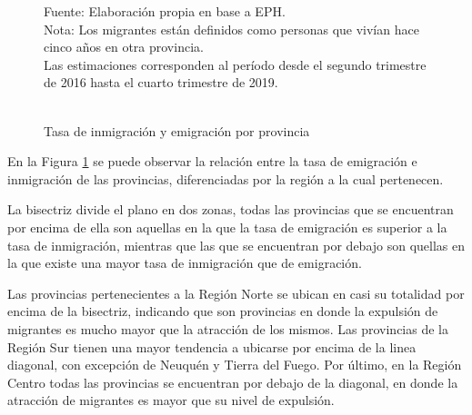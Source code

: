 \documentclass[12pt,a4paper]{article}
\begin{document}
\begin{figure}[h!]
\begin{center}
\caption{\\Tasa de inmigración y emigración por provincia}

\label{figure:emig_inmig_prov}
\end{center}
\begin{flushleft}
\begin{scriptsize}
Fuente: Elaboración propia en base a EPH.\\
Nota: Los migrantes están definidos como personas que vivían hace cinco años en otra provincia.\\
Las estimaciones corresponden al período desde el segundo trimestre de 2016 hasta el cuarto trimestre de 2019.\\
\end{scriptsize}
\end{flushleft}
\end{figure}

En la Figura \ref{figure:emig_inmig_prov} se puede observar la relación entre la tasa de emigración e inmigración de las provincias, diferenciadas por la región a la cual pertenecen.

La bisectriz divide el plano en dos zonas, todas las provincias que se encuentran por encima de ella son aquellas en la que la tasa de emigración es superior a la tasa de inmigración, mientras que las que se encuentran por debajo son quellas en la que existe una mayor tasa de inmigración que de emigración. 

Las provincias pertenecientes a la Región Norte se ubican en casi su totalidad por encima de la bisectriz, indicando que son provincias en donde la expulsión de migrantes es mucho mayor que la atracción de los mismos. Las provincias de la Región Sur tienen una mayor tendencia a ubicarse por encima de la linea diagonal, con excepción de Neuquén y Tierra del Fuego. Por último, en la Región Centro todas las provincias se encuentran por debajo de la diagonal, en donde la atracción de migrantes es mayor que su nivel de expulsión.
\end{document}

